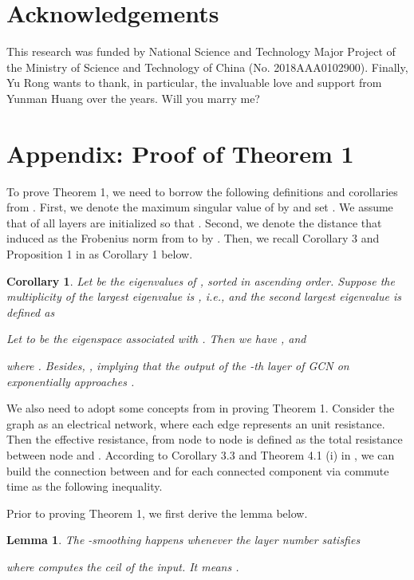 \documentclass{article}
\newtheorem{lemma}[theorem]{Lemma}
\newtheorem{corollary}{Corollary}
\begin{document}
\section{Acknowledgements}
This research was funded by National Science and Technology Major Project of the Ministry of Science and Technology of China (No. 2018AAA0102900).
Finally, Yu Rong wants to thank, in particular, the invaluable love and support from Yunman Huang over the years. Will you marry me?



\clearpage

\appendix
\section{Appendix: Proof of Theorem 1}
To prove Theorem 1, we need to borrow the following definitions and corollaries from \citet{oono2019asymptotic}. First, we denote the maximum singular value of  by  and set . We assume that  of all layers are initialized so that . Second, we denote the distance that induced as the Frobenius norm from  to  by . Then, we recall Corollary 3 and Proposition 1 in \citet{oono2019asymptotic} as Corollary 1 below.
\begin{corollary}
\label{col:1}
Let  be the eigenvalues of , sorted in ascending order. Suppose the multiplicity of the largest eigenvalue  is , i.e.,  and the second largest eigenvalue is defined as

Let  to be the eigenspace associated with . 
Then we have , and

where . Besides, , implying that the output of the -th layer of GCN on  exponentially approaches .
\end{corollary}


We also need to adopt some concepts from \citet{Lovasz1993} in proving Theorem 1. Consider the graph  as an electrical network, where each edge represents an unit resistance. Then the effective resistance,  from node  to node  is defined as the total resistance between node  and . According to Corollary 3.3 and Theorem 4.1 (i) in \citet{Lovasz1993}, we can build the connection between  and  for each connected component via commute time as the following inequality.






Prior to proving Theorem 1, we first derive the lemma below.
\begin{lemma}
\label{lemma:mixing_time}
The -smoothing happens whenever the layer number satisfies

where  computes the ceil of the input. It means .
\end{lemma}
\end{document}
